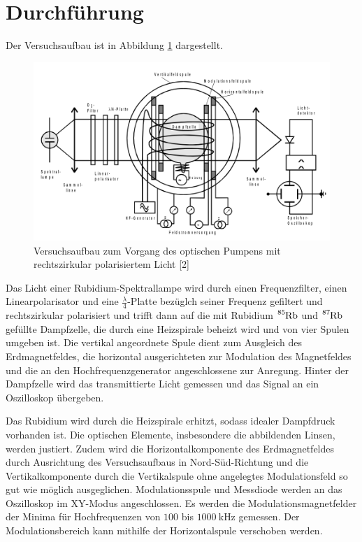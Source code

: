 \section{Durchführung}
\label{sec:Durchführung}

Der Versuchsaufbau ist in Abbildung \ref{fig:bild2} dargestellt.

\begin{figure}[H]
    \centering
    \includegraphics[scale=0.4]{content/bild2.png}
    \caption{Versuchsaufbau zum Vorgang des optischen Pumpens mit rechtszirkular polarisiertem Licht [2]}
    \label{fig:bild2}
  \end{figure}

Das Licht einer Rubidium-Spektrallampe wird durch einen Frequenzfilter, einen Linearpolarisator und eine $\frac{\lambda}{4}$-Platte
bezüglch seiner Frequenz gefiltert und rechtszirkular polarisiert und trifft dann auf die mit Rubidium  $\ce{^{85}Rb}$
und  $\ce{^{87}Rb}$ gefüllte Dampfzelle, die durch eine Heizspirale beheizt wird und von vier Spulen umgeben ist.
Die vertikal angeordnete Spule dient zum Ausgleich des Erdmagnetfeldes, die horizontal ausgerichteten zur Modulation des
Magnetfeldes und die an den Hochfrequenzgenerator angeschlossene zur Anregung.
Hinter der Dampfzelle wird das transmittierte Licht gemessen und das Signal an ein Oszilloskop übergeben.

Das Rubidium wird durch die Heizspirale erhitzt, sodass idealer Dampfdruck vorhanden ist. Die optischen Elemente, insbesondere
die abbildenden Linsen, werden justiert. Zudem wird die Horizontalkomponente des Erdmagnetfeldes durch Ausrichtung
des Versuchsaufbaus in Nord-Süd-Richtung und die Vertikalkomponente durch die Vertikalspule  ohne angelegtes
Modulationsfeld so gut wie möglich ausgeglichen.
Modulationsspule und Messdiode werden an das Oszilloskop im XY-Modus angeschlossen.
Es werden die Modulationsmagnetfelder der Minima für Hochfrequenzen von $\num{100}$ bis $\SI{1000}{\kilo\hertz}$
gemessen. Der Modulationsbereich kann mithilfe der Horizontalspule verschoben werden.


